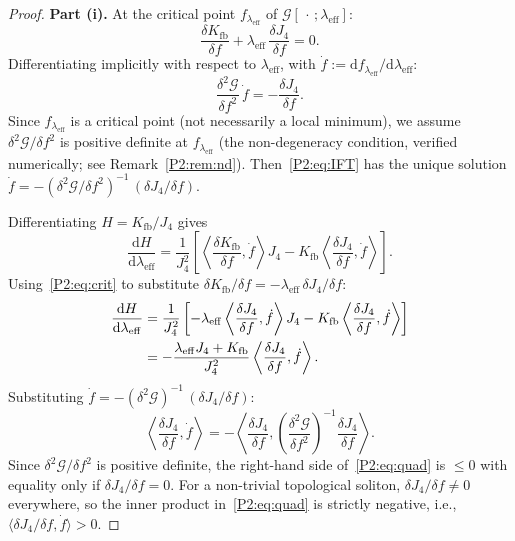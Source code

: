 \documentclass[11pt,a4paper]{article}
\newcommand{\leff}{\lambda_{\mathrm{eff}}}
\newcommand{\Kfb}{K_{\mathrm{fb}}}
\newcommand{\Jfour}{J_{4}}
\newcommand{\G}{\mathcal{G}}
\theoremstyle{remark}
\begin{document}
\begin{proof}
\textbf{Part (i).}
At the critical point $f_{\leff}$ of $\G[\,\cdot\,;\leff]$:
\begin{equation}
  \frac{\delta\Kfb}{\delta f} + \leff\,\frac{\delta\Jfour}{\delta f} = 0.
  \label{P2:eq:crit}
\end{equation}
Differentiating implicitly with respect to $\leff$, with
$\dot{f} := \mathrm{d}f_{\leff}/\mathrm{d}\leff$:
\begin{equation}
  \frac{\delta^2\G}{\delta f^2}\,\dot{f}
  = -\frac{\delta\Jfour}{\delta f}.
  \label{P2:eq:IFT}
\end{equation}
Since $f_{\leff}$ is a critical point (not necessarily a local minimum),
we assume $\delta^2\G/\delta f^2$ is positive definite at $f_{\leff}$
(the non-degeneracy condition, verified numerically; see Remark~\ref{P2:rem:nd}).
Then~\eqref{P2:eq:IFT} has the unique solution
$\dot{f} = -(\delta^2\G/\delta f^2)^{-1}\,(\delta\Jfour/\delta f)$.

Differentiating $H = \Kfb/\Jfour$ gives
\begin{equation}
  \frac{\mathrm{d}H}{\mathrm{d}\leff}
  = \frac{1}{\Jfour^2}
    \left[
      \left\langle \frac{\delta\Kfb}{\delta f}, \dot{f}\right\rangle \Jfour
      - \Kfb\left\langle \frac{\delta\Jfour}{\delta f}, \dot{f}\right\rangle
    \right].
  \label{P2:eq:dHdlam}
\end{equation}
Using~\eqref{P2:eq:crit} to substitute
$\delta\Kfb/\delta f = -\leff\,\delta\Jfour/\delta f$:
\begin{align}
  \frac{\mathrm{d}H}{\mathrm{d}\leff}
  &= \frac{1}{\Jfour^2}
    \left[
      -\leff\left\langle \frac{\delta\Jfour}{\delta f},\dot{f}\right\rangle\Jfour
      - \Kfb\left\langle \frac{\delta\Jfour}{\delta f},\dot{f}\right\rangle
    \right] \notag\\
  &= -\frac{\leff\Jfour + \Kfb}{\Jfour^2}
    \left\langle \frac{\delta\Jfour}{\delta f}, \dot{f}\right\rangle.
  \label{P2:eq:dHdlam2}
\end{align}
Substituting $\dot{f} = -(\delta^2\G)^{-1}\,(\delta\Jfour/\delta f)$:
\begin{equation}
  \left\langle \frac{\delta\Jfour}{\delta f}, \dot{f}\right\rangle
  = -\left\langle \frac{\delta\Jfour}{\delta f},
    \left(\frac{\delta^2\G}{\delta f^2}\right)^{-1}
    \frac{\delta\Jfour}{\delta f}\right\rangle.
  \label{P2:eq:quad}
\end{equation}
Since $\delta^2\G/\delta f^2$ is positive definite, the right-hand
side of~\eqref{P2:eq:quad} is $\leq 0$ with equality only if
$\delta\Jfour/\delta f = 0$.  For a non-trivial topological soliton,
$\delta\Jfour/\delta f\neq 0$ everywhere, so the inner product
in~\eqref{P2:eq:quad} is strictly negative, i.e.,
$\langle\delta\Jfour/\delta f, \dot{f}\rangle > 0$.


\end{proof}
\end{document}
